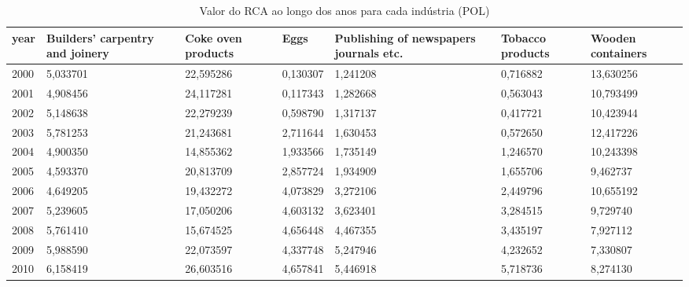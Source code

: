 \begin{table}
\centering
\caption{Valor do RCA ao longo dos anos para cada indústria (POL)}
\begin{tabular}{p{1cm}p{2cm}p{2cm}p{2cm}p{2cm}p{2cm}p{2cm}}
\toprule
 year &  Builders' carpentry and joinery &  Coke oven products &     Eggs &  Publishing of newspapers journals etc. &  Tobacco products &  Wooden containers \\
\midrule
 2000 &                         5,033701 &           22,595286 & 0,130307 &                                1,241208 &          0,716882 &          13,630256 \\
 2001 &                         4,908456 &           24,117281 & 0,117343 &                                1,282668 &          0,563043 &          10,793499 \\
 2002 &                         5,148638 &           22,279239 & 0,598790 &                                1,317137 &          0,417721 &          10,423944 \\
 2003 &                         5,781253 &           21,243681 & 2,711644 &                                1,630453 &          0,572650 &          12,417226 \\
 2004 &                         4,900350 &           14,855362 & 1,933566 &                                1,735149 &          1,246570 &          10,243398 \\
 2005 &                         4,593370 &           20,813709 & 2,857724 &                                1,934909 &          1,655706 &           9,462737 \\
 2006 &                         4,649205 &           19,432272 & 4,073829 &                                3,272106 &          2,449796 &          10,655192 \\
 2007 &                         5,239605 &           17,050206 & 4,603132 &                                3,623401 &          3,284515 &           9,729740 \\
 2008 &                         5,761410 &           15,674525 & 4,656448 &                                4,467355 &          3,435197 &           7,927112 \\
 2009 &                         5,988590 &           22,073597 & 4,337748 &                                5,247946 &          4,232652 &           7,330807 \\
 2010 &                         6,158419 &           26,603516 & 4,657841 &                                5,446918 &          5,718736 &           8,274130 \\

\end{tabular}
\end{table}
